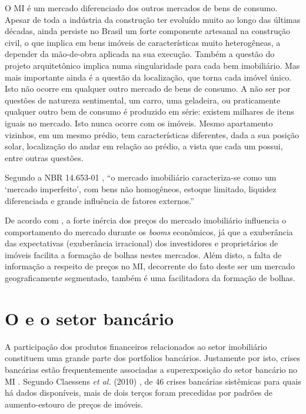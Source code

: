 \documentclass[
	12pt,				%
	oneside,			%
	a4paper,			%
	chapter=TITLE,		%
	section=TITLE,		%
	english,			%
	brazil				%
	]{abntex2}
\begin{document}
\begin{refsection}
O \gls{MI} é um mercado diferenciado dos outros mercados de bens de consumo.
Apesar de toda a indústria da construção ter evoluído muito ao longo das últimas
décadas, ainda persiste no Brasil um forte componente artesanal na construção
civil, o que implica em bens imóveis de características muito heterogêneas, a
depender da mão-de-obra aplicada na sua execução. Também a questão do projeto
arquitetônico implica numa singularidade para cada bem imobiliário. Mas mais
importante ainda é a questão da localização, que torna cada imóvel único. Isto
não ocorre em qualquer outro mercado de bens de consumo. A não ser por questões
de natureza sentimental, um carro, uma geladeira, ou praticamente qualquer outro
bem de consumo é produzido em série: existem milhares de itens iguais no
mercado. Isto nunca ocorre com os imóveis. Mesmo apartamento vizinhos, em um
mesmo prédio, tem características diferentes, dada a sua posição solar,
localização do andar em relação ao prédio, a vista que cada um possui, entre
outras questões.

Segundo a NBR 14.653-01 \autocite*[x]{NBR1465301}, ``o mercado imobiliário caracteriza-se
como um `mercado imperfeito', com bens não homogêneos, estoque limitado,
liquidez diferenciada e grande influência de fatores externos.''

De acordo com \textcite[p.~3]{ADAMS2010}, a forte inércia dos preços do mercado
imobiliário influencia o comportamento do mercado durante os \emph{booms} econômicos,
já que a exuberância das expectativas (exuberância irracional) dos investidores
e proprietários de imóveis facilita a formação de bolhas nestes mercados. Além
disto, a falta de informação a respeito de preços no \gls{MI}, decorrente do
fato deste ser um mercado geograficamente segmentado, também é uma facilitadora
da formação de bolhas.

\hypertarget{MI-e-o-setor-bancario}{%
\section{\texorpdfstring{O  e o setor bancário}{O  e o setor bancário}}\label{MI-e-o-setor-bancario}}

A participação dos produtos financeiros relacionados ao setor imobiliário
constituem uma grande parte dos portfolios bancários. Justamente por isto,
crises bancárias estão frequentemente associadas a superexposição do setor
bancário no \gls{MI} \autocite[148]{Case2000}. Segundo Claessens \emph{et al.}
(2010) \autocite[\emph{apud}][3]{silver}, de 46 crises bancárias sistêmicas para quais há dados
disponíveis, mais de dois terços foram precedidas por padrões de aumento-estouro
de preços de imóveis.


\end{refsection}
\end{document}
